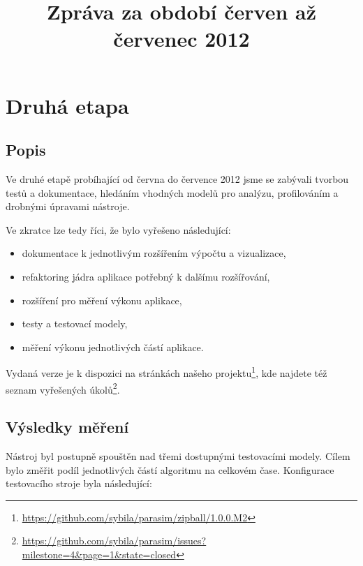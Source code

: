 \documentclass{parasim}
\title{Zpráva za období červen až červenec 2012}
\begin{document}
\section{Druhá etapa}

\subsection{Popis}

Ve druhé etapě probíhající od června do července 2012 jsme se zabývali tvorbou testů 
a dokumentace, hledáním vhodných modelů pro analýzu, profilováním a drobnými úpravami
nástroje.

Ve zkratce lze tedy říci, že bylo vyřešeno následující:

\begin{itemize}
    \item   dokumentace k jednotlivým rozšířením výpočtu a vizualizace,
    \item   refaktoring jádra aplikace potřebný k dalšímu rozšířování,
    \item   rozšíření pro měření výkonu aplikace,
    \item   testy a testovací modely,
    \item   měření výkonu jednotlivých částí aplikace.
\end{itemize}

Vydaná verze je k dispozici na stránkách našeho projektu\footnote{\url{https://github.com/sybila/parasim/zipball/1.0.0.M2}},
kde najdete též seznam vyřešených úkolů\footnote{\url{https://github.com/sybila/parasim/issues?milestone=4&page=1&state=closed}}.

\subsection{Výsledky měření}

Nástroj byl postupně spouštěn nad třemi dostupnými testovacími modely. Cílem bylo
změřit podíl jednotlivých částí algoritmu na celkovém čase. Konfigurace testovacího
stroje byla následující:

\medskip

\begin{center}
\end{center}
\end{document}
